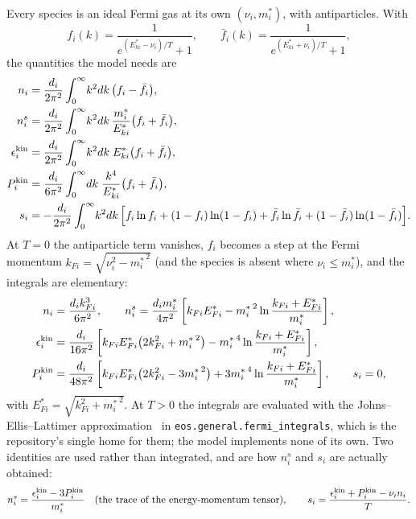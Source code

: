 \documentclass[aps,prc,onecolumn,superscriptaddress,nofootinbib,10pt]{revtex4-2}
\newcommand{\meff}[1]{m^{*}_{#1}}
\begin{document}
Every species is an ideal Fermi gas at its own $(\nu_i, \meff{i})$, with
antiparticles. With
\begin{equation}
  f_i(k) = \frac{1}{e^{(E^*_{ki} - \nu_i)/T} + 1} , \qquad
  \bar{f}_i(k) = \frac{1}{e^{(E^*_{ki} + \nu_i)/T} + 1} ,
  \label{eq:distributions}
\end{equation}
the quantities the model needs are
\begin{align}
  n_i   &= \frac{d_i}{2\pi^2}\int_0^\infty \! k^2 dk\,
           \big(f_i - \bar{f}_i\big) ,
  \label{eq:n} \\
  n^s_i &= \frac{d_i}{2\pi^2}\int_0^\infty \! k^2 dk\,
           \frac{\meff{i}}{E^*_{ki}}\big(f_i + \bar{f}_i\big) ,
  \label{eq:ns} \\
  \epsilon^{\rm kin}_i
        &= \frac{d_i}{2\pi^2}\int_0^\infty \! k^2 dk\; E^*_{ki}
           \big(f_i + \bar{f}_i\big) ,
  \label{eq:epskin} \\
  P^{\rm kin}_i
        &= \frac{d_i}{6\pi^2}\int_0^\infty \! dk\; \frac{k^4}{E^*_{ki}}
           \big(f_i + \bar{f}_i\big) ,
  \label{eq:Pkin} \\
  s_i   &= -\frac{d_i}{2\pi^2}\int_0^\infty \! k^2 dk\,
           \Big[ f_i \ln f_i + (1 - f_i)\ln(1 - f_i)
               + \bar{f}_i \ln \bar{f}_i
               + (1 - \bar{f}_i)\ln(1 - \bar{f}_i) \Big] .
  \label{eq:s}
\end{align}
At $T = 0$ the antiparticle term vanishes, $f_i$ becomes a step at the Fermi
momentum $k_{Fi} = \sqrt{\nu_i^2 - {\meff{i}}^{\,2}}$ (and the species is absent
where $\nu_i \le \meff{i}$), and the integrals are elementary:
\begin{align}
  n_i &= \frac{d_i k_{Fi}^3}{6\pi^2} , \qquad
  n^s_i = \frac{d_i \meff{i}}{4\pi^2}
          \left[ k_{Fi}E^*_{Fi}
                 - {\meff{i}}^{\,2}\ln\frac{k_{Fi}+E^*_{Fi}}{\meff{i}} \right] ,
  \label{eq:nT0} \\
  \epsilon^{\rm kin}_i &= \frac{d_i}{16\pi^2}
          \left[ k_{Fi}E^*_{Fi}\big(2k_{Fi}^2 + {\meff{i}}^{\,2}\big)
                 - {\meff{i}}^{\,4}\ln\frac{k_{Fi}+E^*_{Fi}}{\meff{i}} \right] ,
  \label{eq:epsT0} \\
  P^{\rm kin}_i &= \frac{d_i}{48\pi^2}
          \left[ k_{Fi}E^*_{Fi}\big(2k_{Fi}^2 - 3{\meff{i}}^{\,2}\big)
                 + 3{\meff{i}}^{\,4}\ln\frac{k_{Fi}+E^*_{Fi}}{\meff{i}} \right] ,
  \qquad s_i = 0 ,
  \label{eq:PT0}
\end{align}
with $E^*_{Fi} = \sqrt{k_{Fi}^2 + {\meff{i}}^{\,2}}$. At $T > 0$ the integrals
are evaluated with the Johns--Ellis--Lattimer approximation~\cite{JohnsEllisLattimer1996}
in \texttt{eos.general.fermi\_integrals}, which is the repository's single home
for them; the model implements none of its own. Two identities are used rather
than integrated, and are how $n^s_i$ and $s_i$ are actually obtained:
\begin{equation}
  n^s_i = \frac{\epsilon^{\rm kin}_i - 3 P^{\rm kin}_i}{\meff{i}}
  \quad\text{(the trace of the energy-momentum tensor)},
  \qquad
  s_i = \frac{\epsilon^{\rm kin}_i + P^{\rm kin}_i - \nu_i n_i}{T} .
  \label{eq:identities}
\end{equation}
\end{document}
